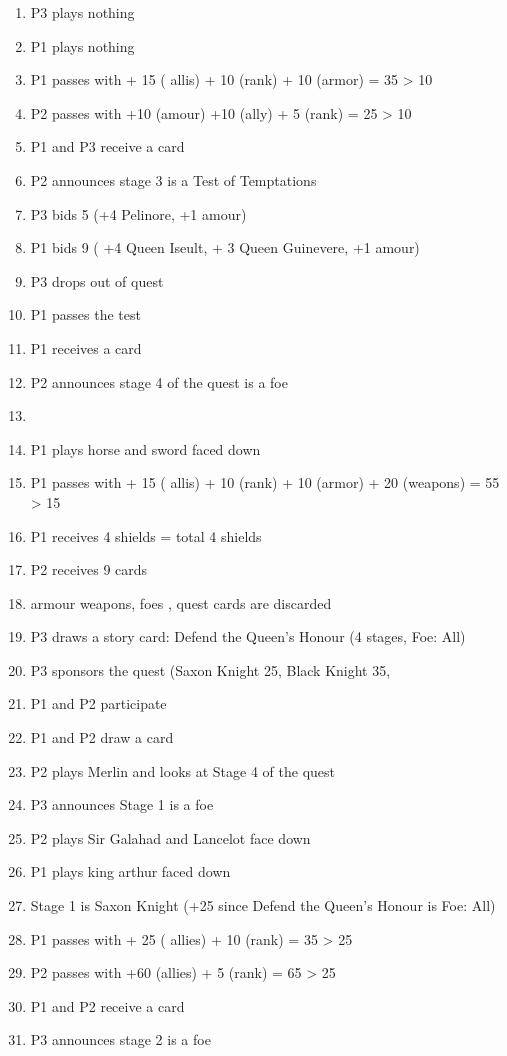 \documentclass[a4paper,11pt]{article}
\begin{document}
\begin{enumerate}
\item P3 plays nothing
\item P1 plays nothing
\item P1 passes with + 15 ( allis) + 10 (rank) + 10 (armor) = 35 > 10
\item P2 passes with +10 (amour) +10 (ally) + 5 (rank) = 25 > 10
\item P1 and P3 receive a card
\item P2 announces stage 3 is a Test of Temptations
\item P3 bids 5 (+4 Pelinore, +1 amour)
\item P1 bids 9 ( +4 Queen Iseult, + 3 Queen Guinevere, +1 amour) 
\item P3 drops out of quest
\item P1 passes the test
\item P1 receives a card
\item P2 announces stage 4 of the quest is a foe\item 
\item P1 plays horse and sword faced down
\item P1 passes with + 15 ( allis) + 10 (rank) + 10 (armor) + 20 (weapons) = 55 > 15
\item P1 receives 4 shields = total 4 shields
\item P2 receives 9 cards
\item armour weapons, foes , quest cards are discarded 
\item P3 draws a story card: Defend the Queen’s Honour (4 stages, Foe: All)
\item P3 sponsors the quest (Saxon Knight 25, Black Knight 35, 
\item P1 and P2 participate
\item P1 and P2 draw a card
\item P2 plays Merlin and looks at Stage 4 of the quest
\item P3 announces Stage 1 is a foe
\item P2 plays Sir Galahad and Lancelot face down
\item P1 plays king arthur faced down
\item Stage 1 is Saxon Knight (+25 since Defend the Queen’s Honour is Foe: All)
\item P1 passes with + 25 ( allies) + 10 (rank) = 35 > 25
\item P2 passes with +60 (allies) + 5 (rank) = 65 > 25
\item P1 and P2 receive a card
\item P3 announces stage 2 is a foe 

\end{enumerate}
\end{document}
